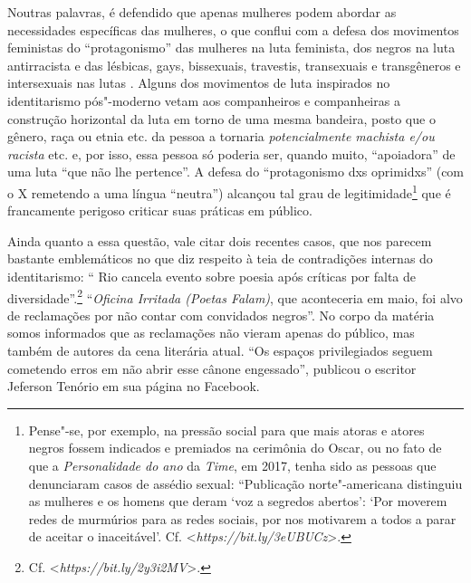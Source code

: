 Noutras palavras, é defendido que apenas mulheres podem abordar as
necessidades específicas das mulheres, o que conflui com a defesa dos
movimentos feministas do ``protagonismo'' das mulheres na luta
feminista, dos negros na luta antirracista e das lésbicas, gays,
bissexuais, travestis, transexuais e transgêneros e intersexuais nas
lutas . Alguns dos movimentos de luta inspirados no identitarismo
pós"-moderno vetam aos companheiros e companheiras a construção
horizontal da luta em torno de uma mesma bandeira, posto que o gênero,
raça ou etnia etc. da pessoa a tornaria \emph{potencialmente machista
e/ou racista} etc. e, por isso, essa pessoa só poderia ser, quando
muito, ``apoiadora'' de uma luta ``que não lhe pertence''. A defesa do
``protagonismo dxs oprimidxs'' (com o X remetendo a uma língua
``neutra'') alcançou tal grau de legitimidade\footnote{Pense"-se, por
  exemplo, na pressão social para que mais atoras e atores negros fossem
  indicados e premiados na cerimônia do Oscar, ou no fato de que a
  \emph{Personalidade do ano} da \emph{Time}, em 2017, tenha sido as
  pessoas que denunciaram casos de assédio sexual: ``Publicação
  norte"-americana distinguiu as mulheres e os homens que deram `voz a
  segredos abertos': `Por moverem redes de murmúrios para as redes
  sociais, por nos motivarem a todos a parar de aceitar o inaceitável'.
  Cf. \textless{}\emph{https://bit.ly/3eUBUCz}\textgreater{}.}
que é francamente perigoso criticar suas práticas em público.

Ainda quanto a essa questão, vale citar dois recentes casos, que nos
parecem bastante emblemáticos no que diz respeito à teia de contradições
internas do identitarismo: `` Rio cancela evento sobre poesia após
críticas por falta de diversidade''.\footnote{Cf.
  \textless{}\emph{https://bit.ly/2y3i2MV}\textgreater{}.}
``\emph{Oficina Irritada (Poetas Falam)}, que aconteceria em maio, foi
alvo de reclamações por não contar com convidados negros''. No corpo da
matéria somos informados que as reclamações não vieram apenas do
público, mas também de autores da cena literária atual. ``Os espaços
privilegiados seguem cometendo erros em não abrir esse cânone
engessado'', publicou o escritor Jeferson Tenório em sua página no
Facebook.

